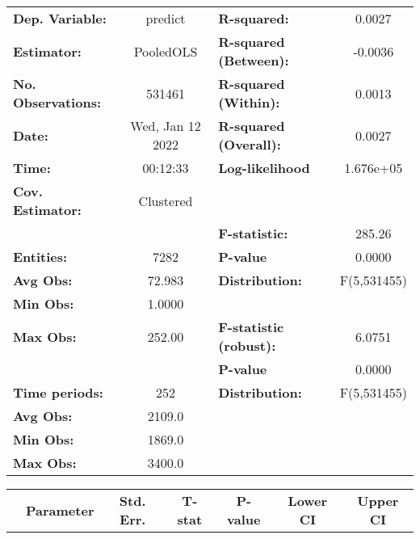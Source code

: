 \begin{center}
\begin{tabular}{lclc}
\toprule
\textbf{Dep. Variable:}    &      predict       & \textbf{  R-squared:         }   &      0.0027      \\
\textbf{Estimator:}        &     PooledOLS      & \textbf{  R-squared (Between):}  &     -0.0036      \\
\textbf{No. Observations:} &       531461       & \textbf{  R-squared (Within):}   &      0.0013      \\
\textbf{Date:}             &  Wed, Jan 12 2022  & \textbf{  R-squared (Overall):}  &      0.0027      \\
\textbf{Time:}             &      00:12:33      & \textbf{  Log-likelihood     }   &    1.676e+05     \\
\textbf{Cov. Estimator:}   &     Clustered      & \textbf{                     }   &                  \\
\textbf{}                  &                    & \textbf{  F-statistic:       }   &      285.26      \\
\textbf{Entities:}         &        7282        & \textbf{  P-value            }   &      0.0000      \\
\textbf{Avg Obs:}          &       72.983       & \textbf{  Distribution:      }   &   F(5,531455)    \\
\textbf{Min Obs:}          &       1.0000       & \textbf{                     }   &                  \\
\textbf{Max Obs:}          &       252.00       & \textbf{  F-statistic (robust):} &      6.0751      \\
\textbf{}                  &                    & \textbf{  P-value            }   &      0.0000      \\
\textbf{Time periods:}     &        252         & \textbf{  Distribution:      }   &   F(5,531455)    \\
\textbf{Avg Obs:}          &       2109.0       & \textbf{                     }   &                  \\
\textbf{Min Obs:}          &       1869.0       & \textbf{                     }   &                  \\
\textbf{Max Obs:}          &       3400.0       & \textbf{                     }   &                  \\
\bottomrule
\end{tabular}
\begin{tabular}{lcccccc}
                & \textbf{Parameter} & \textbf{Std. Err.} & \textbf{T-stat} & \textbf{P-value} & \textbf{Lower CI} & \textbf{Upper CI}  \\

\end{tabular}
\end{center}
